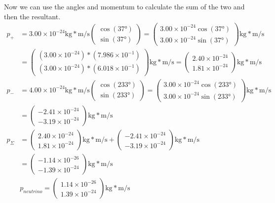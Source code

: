 \documentclass[12pt]{article}
\begin{document}
Now we can use the angles and momentum to calculate the sum of the two and then the resultant.
\begin{align*}
    p_+ &=  3.00\times10^{-24} \unit{\kilo\gram*\meter/\second} \begin{pmatrix} \cos(37\unit{\degree}) \\ \sin(37\unit{\degree}) \end{pmatrix}
        =   \begin{pmatrix} 3.00\times10^{-24}\cos(37\unit{\degree}) \\ 3.00\times10^{-24}\sin(37\unit{\degree}) \end{pmatrix} \unit{\kilo\gram*\meter/\second} \\
        &=  \begin{pmatrix} (3.00\times10^{-24}) * (7.986\times10^{-1}) \\ (3.00\times10^{-24}) * (6.018\times10^{-1}) \end{pmatrix} \unit{\kilo\gram*\meter/\second}
        =  \begin{pmatrix} 2.40\times10^{-24} \\ 1.81\times10^{-24} \end{pmatrix} \unit{\kilo\gram*\meter/\second}\\
    p_- &=  4.00\times10^{-24} \unit{\kilo\gram*\meter/\second} \begin{pmatrix} \cos(233\unit{\degree}) \\ \sin(233\unit{\degree}) \end{pmatrix}
        =   \begin{pmatrix} 3.00\times10^{-24}\cos(233\unit{\degree}) \\ 3.00\times10^{-24}\sin(233\unit{\degree}) \end{pmatrix} \unit{\kilo\gram*\meter/\second} \\
        &=  \begin{pmatrix} -2.41\times10^{-24} \\ -3.19\times10^{-24} \end{pmatrix} \unit{\kilo\gram*\meter/\second}\\
    p_\Sigma    &=  \begin{pmatrix} 2.40\times10^{-24} \\ 1.81\times10^{-24} \end{pmatrix} \unit{\kilo\gram*\meter/\second} + \begin{pmatrix} -2.41\times10^{-24} \\ -3.19\times10^{-24} \end{pmatrix} \unit{\kilo\gram*\meter/\second}\\
        &=  \begin{pmatrix} -1.14\times10^{-26} \\ -1.39\times10^{-24} \end{pmatrix} \unit{\kilo\gram*\meter/\second}\\
    &p_{neutrino}   =   \boxed{\begin{pmatrix} 1.14\times10^{-26} \\ 1.39\times10^{-24} \end{pmatrix} \unit{\kilo\gram*\meter/\second}}
\end{align*}
\end{document}
